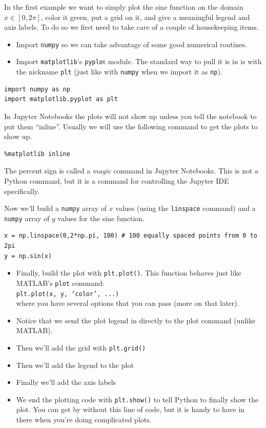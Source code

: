 \begin{example}
    In the first example we want to simply plot the sine function on the domain  $x \in
    [0,2\pi]$, color it green, put a grid on it, and give a meaningful legend and axis
    labels.  To do so we first need to take care of a couple of housekeeping items.
    \begin{itemize}
        \item Import \texttt{numpy} so we can take advantage of some good numerical routines.
        \item Import \texttt{matplotlib}'s \texttt{pyplo}t module. The standard way to
            pull it is in is with the nickname \texttt{plt} (just like with
            \texttt{numpy} when we import it as \texttt{np}).
    \end{itemize}
\bcode
\begin{lstlisting}
import numpy as np 
import matplotlib.pyplot as plt
\end{lstlisting}

    In Jupyter Notebooks the plots will not show up unless you tell the notebook to put
    them ``inline''.  Usually we will use the following command to get the plots to show up.

\bcode
\begin{lstlisting}
%matplotlib inline
\end{lstlisting}
    The percent sign is called a {\it magic} command in Jupyter Notebooks.  This is not a
    Python command, but it is a command for controlling the Jupyter IDE specifically.  

    Now we'll build a \texttt{numpy} array of $x$ values (using the \texttt{linspace}
    command) and a \texttt{numpy} array of $y$ values for the sine function.

\bcode
\begin{lstlisting}
x = np.linspace(0,2*np.pi, 100) # 100 equally spaced points from 0 to 2pi
y = np.sin(x)
\end{lstlisting}

\begin{itemize}
    \item Finally, build the plot with \texttt{plt.plot()}.  This function behaves just
        like MATLAB's \texttt{plot} command: \\
        \texttt{plt.plot(x, y, 'color', ...)} \\
        where you have several options that you can pass (more on that later).
    \item Notice that we send the plot legend in directly to the plot command (unlike MATLAB).
    \item Then we'll add the grid with \texttt{plt.grid()}
    \item Then we'll add the legend to the plot
    \item Finally we'll add the axis labels
    \item We end the plotting code with \texttt{plt.show()} to tell Python to finally show
        the plot.  You can get by without this line of code, but it is handy to have in
        there when you're doing complicated plots.
\end{itemize}


\end{example}
